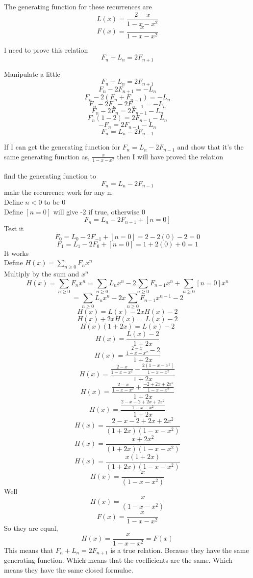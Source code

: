 \documentclass[10pt, AMS Euler]{article}
\begin{document}
\begin{enumerate}[resume]
            The generating function for these recurrences are
            $$ L(x) = \frac{2-x}{ 1 - x - x^2 } $$
            $$ F(x) = \frac{x}{1-x-x^2} $$

            I need to prove this relation
            $$ F_n +L_n =2F_{n+1} $$

            Manipulate a little
            $$ F_n +L_n =2F_{n+1} $$
            $$ F_n - 2F_{n+1} = - L_n $$
            $$ F_n - 2(F_{n} + F_{n-1}) = - L_n $$
            $$ F_n - 2F_{n} - 2 F_{n-1} = - L_n $$
            $$ F_n - 2F_{n} = 2 F_{n-1} - L_n $$
            $$ F_n (1 - 2) = 2 F_{n-1} - L_n $$
            $$ - F_n = 2 F_{n-1} - L_n $$
            $$ F_n = L_n - 2 F_{n-1} $$

            If I can get the generating function for $ F_n = L_n - 2 F_{n-1} $ and show that it's the same generating function as, $\frac{x}{ 1 - x - x^2 }$ then I will have proved the relation \\
            \\
            find the generating function to 
            $$ F_n = L_n - 2 F_{n-1} $$
            make the recurrence work for any n. \\
            Define $n<0$ to be 0 \\
            Define $[n=0]$ will give -2 if true, otherwise 0
            $$ F_n = L_n - 2 F_{n-1} + [n=0] $$
            Test it 
            $$ F_0 = L_0 - 2 F_{-1} + [n=0] = 2 - 2(0) - 2 = 0 $$
            $$ F_1 = L_1 - 2 F_{0} + [n=0] = 1 + 2(0) + 0 = 1 $$
            It works \\
            Define $ H(x) = \sum_{n\geq0} F_n x^n $ \\
            Multiply by the sum and $x^n$
            $$ H(x) = \sum_{n\geq0} F_n x^n = \sum_{n\geq0} L_n x^n - 2 \sum_{n\geq0} F_{n-1} x^n + \sum_{n\geq0} [n=0] x^n $$
            $$ = \sum_{n\geq0} L_n x^n - 2x \sum_{n\geq0} F_{n-1} x^{n-1} - 2 $$
            $$ H(x) = L(x) - 2x H(x) - 2 $$
            $$ H(x) + 2x H(x) = L(x) - 2 $$
            $$ H(x)(1 + 2x) = L(x) - 2 $$
            $$ H(x) = \frac{L(x) - 2}{1 + 2x} $$
            $$ H(x) = \frac{\frac{2-x}{ 1 - x - x^2 } - 2}{1 + 2x} $$
            $$ H(x) = \frac{\frac{2-x}{ 1 - x - x^2 } - \frac{2(1 - x - x^2)}{1 - x - x^2} }{1 + 2x} $$
            $$ H(x) = \frac{\frac{2-x}{ 1 - x - x^2 } + \frac{-2 + 2x + 2x^2}{1 - x - x^2} }{1 + 2x} $$
            $$ H(x) = \frac{\frac{2-x-2 + 2x + 2x^2}{ 1 - x - x^2 } }{1 + 2x} $$
            $$ H(x) = \frac{2-x-2 + 2x + 2x^2}{ (1 + 2x)(1 - x - x^2) }  $$
            $$ H(x) = \frac{x + 2x^2}{ (1 + 2x)(1 - x - x^2) }  $$
            $$ H(x) = \frac{x(1+ 2x)}{ (1 + 2x)(1 - x - x^2) }  $$
            $$ H(x) = \frac{x}{ (1 - x - x^2) } $$
            Well 
            $$ H(x) = \frac{x}{ (1 - x - x^2) } $$
            $$ F(x) = \frac{x}{1-x-x^2} $$
            So they are equal,
            $$ H(x) = \frac{x}{1-x-x^2} = F(x) $$
            This means that $ F_n +L_n =2F_{n+1} $ is a true relation. Because they have the same generating function. Which means that the coefficients are the same. Which means they have the same closed formulae.
            

\end{enumerate}
\end{document}
